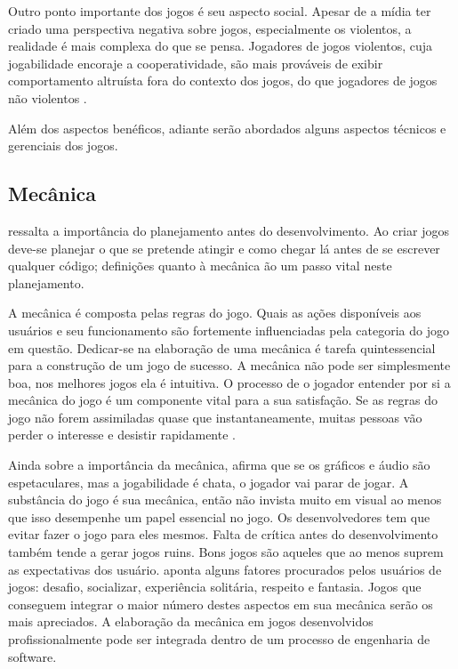 Outro ponto importante dos jogos é seu aspecto social. Apesar de a
mídia ter criado uma perspectiva negativa sobre jogos, especialmente
os violentos, a realidade é mais complexa do que se pensa. Jogadores
de jogos violentos, cuja jogabilidade encoraje a cooperatividade, são
mais prováveis de exibir comportamento altruísta fora do contexto dos
jogos, do que jogadores de jogos não violentos \autocite{gamebenefits}.

Além dos aspectos benéficos, adiante serão abordados alguns aspectos
técnicos e gerenciais dos jogos.

\subsection{Mecânica}

\citet{html5mostwanted} ressalta a importância do planejamento antes
do desenvolvimento. Ao criar jogos deve-se planejar o que se pretende
atingir e como chegar lá antes de se escrever qualquer código;
definições quanto à mecânica ão um passo vital neste planejamento.

A mecânica é composta pelas regras do jogo. Quais as ações
disponíveis aos usuários e seu funcionamento são fortemente
influenciadas pela categoria do jogo em questão. Dedicar-se na
elaboração de uma mecânica é tarefa quintessencial para a
construção de um jogo de sucesso. A mecânica não pode ser
simplesmente boa, nos melhores jogos ela é intuitiva. O processo de
o jogador entender por si a mecânica do jogo é um componente vital
para a sua satisfação. Se as regras do jogo não forem assimiladas quase
que instantaneamente, muitas pessoas vão perder o interesse e desistir
rapidamente \autocite{crossPlatformMobileGame}.

Ainda sobre a importância da mecânica, \citet{html5mostwanted} afirma
que se os gráficos e áudio são espetaculares, mas a jogabilidade
é chata, o jogador vai parar de jogar. A substância do jogo é
sua mecânica, então não invista muito em visual ao menos que
isso desempenhe um papel essencial no jogo. Os desenvolvedores tem
que evitar fazer o jogo para eles mesmos. Falta de crítica antes
do desenvolvimento também tende a gerar jogos ruins. Bons jogos
são aqueles que ao menos suprem as expectativas dos usuário.
\citet{indieGamesLemes} aponta alguns fatores procurados pelos usuários
de jogos: desafio, socializar, experiência solitária, respeito e
fantasia. Jogos que conseguem integrar o maior número destes aspectos
em sua mecânica serão os mais apreciados. A elaboração da mecânica
em jogos desenvolvidos profissionalmente pode ser integrada dentro de um
processo de engenharia de software.

